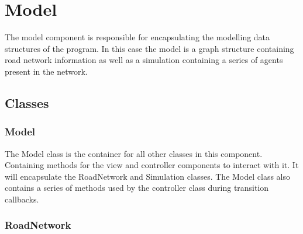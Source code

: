 
\section{Model}

    The model component is responsible for encapsulating the modelling data structures of the program. In this case the model is a graph structure containing road network information as well as a simulation containing a series of agents present in the network.

    \subsection{Classes}

        \subsubsection{Model}

            The Model class is the container for all other classes in this component. Containing methods for the view and controller components to interact with it. It will encapsulate the RoadNetwork and Simulation classes. The Model class also contains a series of methods used by the controller class during transition callbacks.


        \subsubsection{RoadNetwork}

